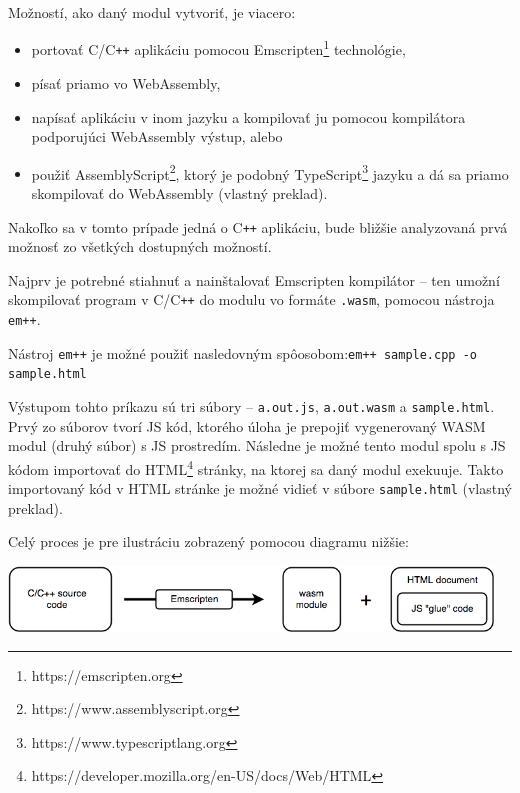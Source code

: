 Možností, ako daný modul vytvoriť, je viacero:
\begin {itemize}
\item {portovať C/C\texttt{++} aplikáciu pomocou Emscripten\footnote{https://emscripten.org} technológie,}
\item {písať priamo vo WebAssembly,}
\item {napísať aplikáciu v inom jazyku a kompilovať ju pomocou kompilátora podporujúci WebAssembly výstup, alebo}
\item {použiť AssemblyScript\footnote{https://www.assemblyscript.org}, ktorý je podobný TypeScript\footnote{https://www.typescriptlang.org} jazyku a dá sa priamo skompilovať do WebAssembly \cite{webassembly_concepts} (vlastný preklad).}
\end {itemize}

Nakoľko sa v tomto prípade jedná o C\texttt{++} aplikáciu, bude bližšie analyzovaná prvá možnosť zo všetkých dostupných možností.

\clearpage

Najprv je potrebné stiahnuť a nainštalovať Emscripten kompilátor -- ten umožní skompilovať program v C/C\texttt{++} do modulu vo formáte \texttt{.wasm}, pomocou nástroja \texttt{em++}.

Nástroj \texttt{em++} je možné použiť nasledovným spôosobom:\newline \texttt{em++ sample.cpp -o sample.html} 

Výstupom tohto príkazu sú tri súbory -- \texttt{a.out.js}, \texttt{a.out.wasm} a \texttt{sample.html}. Prvý zo súborov tvorí JS kód, ktorého úloha je prepojiť vygenerovaný WASM modul (druhý súbor) s JS prostredím. Následne je možné tento modul spolu s JS kódom importovať do HTML\footnote{https://developer.mozilla.org/en-US/docs/Web/HTML} stránky, na ktorej sa daný modul exekuuje. Takto importovaný kód v HTML stránke je možné vidieť v súbore \texttt{sample.html} \cite{cpp_to_wasm} (vlastný preklad).

Celý proces je pre ilustráciu zobrazený pomocou diagramu nižšie:
\begin {center}
        \centering
        \includegraphics[height=1.75cm]{media/graphs/cpp_to_wasm.png}
        \captionsetup{justification=centering}
\end {center}

